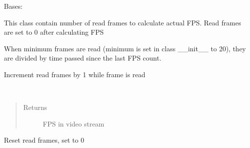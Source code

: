 \documentclass[letterpaper,10pt,english]{sphinxmanual}
\begin{document}
\begin{fulllineitems}
\label{\detokenize{doc/VideoStream/FrameCounter:FrameCounter.FrameCounter}}
Bases: 

This class contain number of read frames to calculate actual FPS. Read frames are set to 0 after calculating FPS

\begin{fulllineitems}
\label{\detokenize{doc/VideoStream/FrameCounter:FrameCounter.FrameCounter.calculate_FPS}}
When minimum frames are read (minimum is set in class \_\_init\_\_ to 20),
they are divided by time passed since the last FPS count.

\end{fulllineitems}


\begin{fulllineitems}
\label{\detokenize{doc/VideoStream/FrameCounter:FrameCounter.FrameCounter.frame_read}}
Increment read frames by 1 while frame is read

\end{fulllineitems}


\begin{fulllineitems}
\label{\detokenize{doc/VideoStream/FrameCounter:FrameCounter.FrameCounter.get_FPS}}~\begin{quote}\begin{description}
\item[{Returns}] \leavevmode
FPS in video stream

\end{description}\end{quote}

\end{fulllineitems}


\begin{fulllineitems}
\label{\detokenize{doc/VideoStream/FrameCounter:FrameCounter.FrameCounter.reset_frame_read}}
Reset read frames, set to 0

\end{fulllineitems}


\end{fulllineitems}
\end{document}
